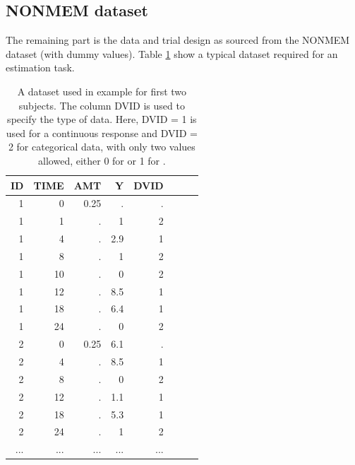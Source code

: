 \subsection{NONMEM dataset}
\label{sec:eg7-NONMEMdataset}
The remaining part is the data and trial design as sourced from the 
NONMEM dataset (with dummy values). Table \ref{tab:example7_dataSet} show a typical dataset required for 
an estimation task.
\begin{table}[htdp]
\begin{center}
\small
\renewcommand{\arraystretch}{1.1}%
\begin{tabular}{rrrrrrrr}\toprule
ID 	& TIME	& AMT	& Y		& DVID \\ \midrule
1 	& 0 		& 0.25 	& . 		& . \\ 
1 	& 1 		& . 		& 1	 	& 2 \\ 
1 	& 4 		& . 		& 2.9 	& 1 \\ 
1 	& 8 		& . 		& 1 		& 2 \\ 
1 	& 10		& . 		& 0	 	& 2 \\ 
1 	& 12 	& . 		& 8.5 	& 1 \\ 
1 	& 18 	& . 		& 6.4 	& 1 \\ 
1 	& 24 	& . 		& 0 		& 2 \\ 
2 	& 0 		& 0.25	& 6.1 	& . \\ 
2 	& 4 		& . 		& 8.5 	& 1 \\ 
2 	& 8 		& . 		& 0 		& 2 \\ 
2 	& 12 	& . 		& 1.1 	& 1 \\ 
2 	& 18 	& . 		& 5.3 	& 1 \\ 
2 	& 24 	& . 		& 1 		& 2 \\ 
...	& ...		& ...		& ...		& ...	\\ \bottomrule
\end{tabular}
\end{center}
\caption{A dataset used in example for first two subjects.
The column DVID is used to specify the type of data. Here, 
DVID = 1 is used for a continuous response and DVID = 2 for categorical data, 
with only two values allowed, either 0 for  or 1 for .}
\label{tab:example7_dataSet}
\end{table}%

